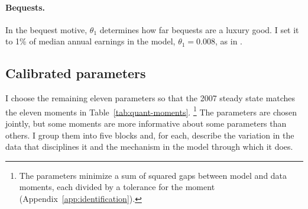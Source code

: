 \paragraph{Bequests.}
In the bequest motive, $\theta_1$ determines how far bequests are a luxury
good. I set it to 1\% of median annual earnings in the model,
$\theta_1=0.008$, as in \citet{greaneyDynamicUrbanEconomics2025}.

\subsection{Calibrated parameters}
\label{sec:quant-identification}

I choose the remaining eleven parameters so that the 2007 steady state
matches the eleven moments in Table~\ref{tab:quant-moments}.%
\footnote{The parameters minimize a sum of squared gaps between model and
data moments, each divided by a tolerance for the moment
(Appendix~\ref{app:identification}).}
The parameters are chosen jointly, but some moments are more informative
about some parameters than others. I group them into five blocks and, for
each, describe the variation in the data that disciplines it and the
mechanism in the model through which it does.

